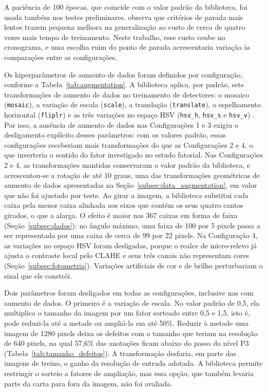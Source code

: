 \documentclass[
    12pt,                %
    openright,           %
    oneside,             %
    a4paper,             %
    english,             %
    brazil               %
]{abntex2}
\begin{document}
A paciência de 100 épocas, que coincide com o valor padrão da
biblioteca, foi usada também nos testes preliminares.  observa que critérios
de parada mais lentos trazem pequena melhora na generalização ao custo
de cerca de quatro vezes mais tempo de treinamento. Neste trabalho,
esse custo coube no cronograma, e uma escolha ruim do ponto de parada
acrescentaria variação às comparações entre as configurações.

Os hiperparâmetros de aumento de dados foram definidos por
configuração, conforme a Tabela~\ref{tab:augmentation}. A biblioteca
aplica, por padrão, sete transformações de aumento de dados no
treinamento de detectores: o mosaico (\texttt{mosaic}), a variação de
escala (\texttt{scale}), a translação (\texttt{translate}), o
espelhamento horizontal (\texttt{fliplr}) e as três variações no espaço
HSV (\texttt{hsv\_h}, \texttt{hsv\_s} e \texttt{hsv\_v})
\cite{Jocher2023}. Por isso, a ausência de aumento de dados nas
Configurações 1 e 3 exigiu o desligamento explícito desses parâmetros:
com os valores padrão, essas configurações receberiam mais
transformações do que as Configurações 2 e 4, o que inverteria o
sentido do fator investigado no estudo fatorial. Nas Configurações 2 e
4, as transformações mantidas conservaram o valor padrão da biblioteca,
e acrescentou-se a rotação de até 10 graus, uma das transformações geométricas de aumento de dados apresentadas na Seção~\ref{subsec:data_augmentation}, em valor que não foi ajustado por teste. Ao girar a imagem, a biblioteca
substitui cada caixa pela menor caixa alinhada aos eixos que contém os
seus quatro cantos girados, o que a alarga. O efeito é maior nas 367
caixas em forma de faixa (Seção~\ref{subsec:dados}): no ângulo máximo,
uma faixa de 100 por 5 pixels passa a ser representada por uma caixa de
cerca de 99 por 22 pixels. Na Configuração 4, as
variações no espaço HSV foram desligadas, porque o realce de
micro-relevo já ajusta o contraste local pelo CLAHE e seus três canais
não representam cores (Seção~\ref{subsec:fotometria}). Variações
artificiais de cor e de brilho perturbariam o sinal que ele constrói.

Dois parâmetros foram desligados em todas as configurações, inclusive
nas com aumento de dados. O primeiro é a variação de escala. No valor
padrão de 0,5, ela multiplica o tamanho da imagem por um fator sorteado
entre 0,5 e 1,5, isto é, pode reduzi-la até a metade ou ampliá-la em
até 50\%. Reduzir à metade uma imagem de 1280 pixels deixa os defeitos com o tamanho que
teriam na resolução de 640 pixels, na qual 57,6\% das anotações ficam
abaixo do passo do nível P3 (Tabela~\ref{tab:tamanho_defeitos}). A
transformação desfaria, em parte das imagens de treino, o ganho da
resolução de entrada adotada. A biblioteca permite restringir o sorteio
a fatores de ampliação, mas essa opção, que também levaria parte da
carta para fora da imagem, não foi avaliada.
\end{document}
